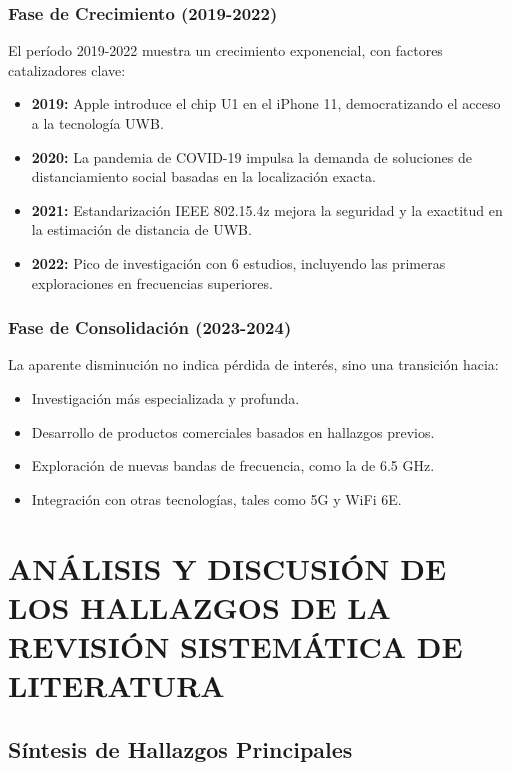 \subsubsection{Fase de Crecimiento (2019-2022)}

El período 2019-2022 muestra un crecimiento exponencial, con factores catalizadores clave:

\begin{itemize}
    \item \textbf{2019:} Apple introduce el chip U1 en el iPhone 11, democratizando el acceso a la tecnología UWB.
    \item \textbf{2020:} La pandemia de COVID-19 impulsa la demanda de soluciones de distanciamiento social basadas en la localización exacta.
    \item \textbf{2021:} Estandarización IEEE 802.15.4z mejora la seguridad y la exactitud en la estimación de distancia de  UWB.
    \item \textbf{2022:} Pico de investigación con 6 estudios, incluyendo las primeras exploraciones en frecuencias superiores.
\end{itemize}

\subsubsection{Fase de Consolidación (2023-2024)}

La aparente disminución no indica pérdida de interés, sino una transición hacia:

\begin{itemize}
    \item Investigación más especializada y profunda.
    \item Desarrollo de productos comerciales basados en hallazgos previos.
    \item Exploración de nuevas bandas de frecuencia, como la de 6.5 GHz.
    \item Integración con otras tecnologías, tales como 5G y WiFi 6E.
\end{itemize}




\section{ANÁLISIS Y DISCUSIÓN DE LOS HALLAZGOS DE LA REVISIÓN SISTEMÁTICA DE LITERATURA}
\label{sec:analisis_discusion}

\subsection{Síntesis de Hallazgos Principales}
\label{subsec:sintesis_hallazgos}


